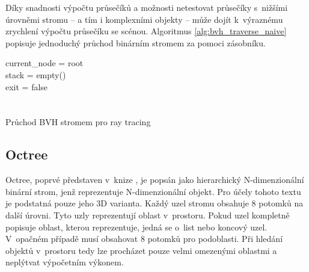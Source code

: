 Díky snadnosti výpočtu průsečíků a možnosti netestovat průsečíky s~nižšími úrovněmi stromu -- a tím i komplexními objekty -- může dojít k~výraznému zrychlení výpočtu průsečíku se scénou. Algoritmus \ref{alg:bvh_traverse_naive} popisuje jednoduchý průchod binárním stromem za pomoci zásobníku.

\begin{center}
	\begin{czechalgorithm}[H] \label{alg:bvh_traverse_naive}
		current\_node = root\\
		stack = empty()\\
		exit = false\\
		 {\\
		}\\
		\caption{Průchod BVH stromem pro ray tracing \cite{Vaidyanathan2019WideBT}}
	\end{czechalgorithm}
\end{center}



\subsection{Octree} \label{octree}
Octree, poprvé představen v~knize \cite{rensselaer1980octree}, je popsán jako hierarchický N-dimenzionální binární strom, jenž reprezentuje N-dimenzionální objekt. Pro účely tohoto textu je podstatná pouze jeho 3D varianta. Každý uzel stromu obsahuje 8 potomků na další úrovni. Tyto uzly reprezentují oblast v~prostoru. Pokud uzel kompletně popisuje oblast, kterou reprezentuje, jedná se o~list nebo koncový uzel. V~opačném případě musí obsahovat 8 potomků pro podoblasti. Při hledání objektů v~prostoru tedy lze procházet pouze velmi omezenými oblastmi a neplýtvat výpočetním výkonem.


